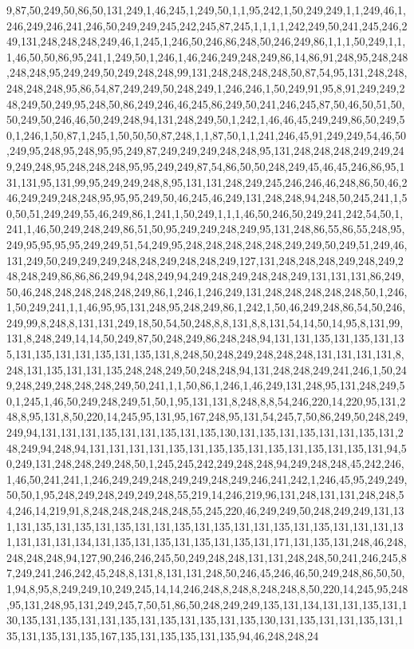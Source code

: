 9,87,50,249,50,86,50,131,249,1,46,245,1,249,50,1,1,95,242,1,50,249,249,1,1,249,46,1,246,249,246,241,246,50,249,249,245,242,245,87,245,1,1,1,1,242,249,50,241,245,246,249,131,248,248,248,249,46,1,245,1,246,50,246,86,248,50,246,249,86,1,1,1,50,249,1,1,1,46,50,50,86,95,241,1,249,50,1,246,1,46,246,249,248,249,86,14,86,91,248,95,248,248,248,248,95,249,249,50,249,248,248,99,131,248,248,248,248,50,87,54,95,131,248,248,248,248,248,95,86,54,87,249,249,50,248,249,1,246,246,1,50,249,91,95,8,91,249,249,248,249,50,249,95,248,50,86,249,246,46,245,86,249,50,241,246,245,87,50,46,50,51,50,50,249,50,246,46,50,249,248,94,131,248,249,50,1,242,1,46,46,45,249,249,86,50,249,50,1,246,1,50,87,1,245,1,50,50,50,87,248,1,1,87,50,1,1,241,246,45,91,249,249,54,46,50,249,95,248,95,248,95,95,249,87,249,249,249,248,248,95,131,248,248,248,249,249,249,249,248,95,248,248,248,95,95,249,249,87,54,86,50,50,248,249,45,46,45,246,86,95,131,131,95,131,99,95,249,249,248,8,95,131,131,248,249,245,246,246,46,248,86,50,46,246,249,249,248,248,95,95,95,249,50,46,245,46,249,131,248,248,94,248,50,245,241,1,50,50,51,249,249,55,46,249,86,1,241,1,50,249,1,1,1,46,50,246,50,249,241,242,54,50,1,241,1,46,50,249,248,249,86,51,50,95,249,249,248,249,95,131,248,86,55,86,55,248,95,249,95,95,95,95,249,249,51,54,249,95,248,248,248,248,248,249,249,50,249,51,249,46,131,249,50,249,249,249,248,248,249,248,248,249,127,131,248,248,248,249,248,249,248,248,249,86,86,86,249,94,248,249,94,249,248,249,248,248,249,131,131,131,86,249,50,46,248,248,248,248,248,249,86,1,246,1,246,249,131,248,248,248,248,248,50,1,246,1,50,249,241,1,1,46,95,95,131,248,95,248,249,86,1,242,1,50,46,249,248,86,54,50,246,249,99,8,248,8,131,131,249,18,50,54,50,248,8,8,131,8,8,131,54,14,50,14,95,8,131,99,131,8,248,249,14,14,50,249,87,50,248,249,86,248,248,94,131,131,135,131,135,131,135,131,135,131,131,135,131,135,131,8,248,50,248,249,248,248,248,131,131,131,131,8,248,131,135,131,131,135,248,248,249,50,248,248,94,131,248,248,249,241,246,1,50,249,248,249,248,248,248,249,50,241,1,1,50,86,1,246,1,46,249,131,248,95,131,248,249,50,1,245,1,46,50,249,248,249,51,50,1,95,131,131,8,248,8,8,54,246,220,14,220,95,131,248,8,95,131,8,50,220,14,245,95,131,95,167,248,95,131,54,245,7,50,86,249,50,248,249,249,94,131,131,131,135,131,131,135,131,135,130,131,135,131,135,131,131,135,131,248,249,94,248,94,131,131,131,131,135,131,135,135,131,135,131,135,131,135,131,94,50,249,131,248,248,249,248,50,1,245,245,242,249,248,248,94,249,248,248,45,242,246,1,46,50,241,241,1,246,249,249,248,249,249,248,249,246,241,242,1,246,45,95,249,249,50,50,1,95,248,249,248,249,249,248,55,219,14,246,219,96,131,248,131,131,248,248,54,246,14,219,91,8,248,248,248,248,248,55,245,220,46,249,249,50,248,249,249,131,131,131,135,131,135,131,135,131,131,135,131,135,131,131,135,131,135,131,131,131,131,131,131,131,134,131,135,131,135,131,135,131,135,131,171,131,135,131,248,46,248,248,248,248,94,127,90,246,246,245,50,249,248,248,131,131,248,248,50,241,246,245,87,249,241,246,242,45,248,8,131,8,131,131,248,50,246,45,246,46,50,249,248,86,50,50,1,94,8,95,8,249,249,10,249,245,14,14,246,248,8,248,8,248,248,8,50,220,14,245,95,248,95,131,248,95,131,249,245,7,50,51,86,50,248,249,249,135,131,134,131,131,135,131,130,135,131,135,131,131,135,131,135,131,135,131,135,130,131,135,131,131,135,131,135,131,135,131,135,167,135,131,135,135,131,135,94,46,248,248,24
